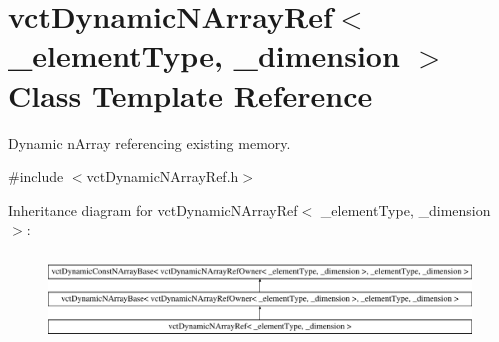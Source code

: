 \hypertarget{classvct_dynamic_n_array_ref}{}\section{vct\+Dynamic\+N\+Array\+Ref$<$ \+\_\+element\+Type, \+\_\+dimension $>$ Class Template Reference}
\label{classvct_dynamic_n_array_ref}


Dynamic n\+Array referencing existing memory.  




{\ttfamily \#include $<$vct\+Dynamic\+N\+Array\+Ref.\+h$>$}

Inheritance diagram for vct\+Dynamic\+N\+Array\+Ref$<$ \+\_\+element\+Type, \+\_\+dimension $>$\+:\begin{figure}[H]
\begin{center}
\leavevmode
\includegraphics[height=2.366197cm]{d0/d43/classvct_dynamic_n_array_ref}
\end{center}
\end{figure}
